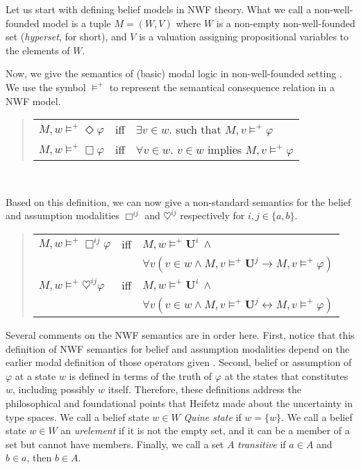 \documentclass{article}
\begin{document}
Let us start with defining belief models in NWF theory. What we call a non-well-founded model is a tuple $M = (W, V)$ where $W$ is a non-empty non-well-founded set (\emph{hyperset}, for short), and $V$ is a valuation assigning propositional variables to the elements of $W$.

Now, we give the semantics of (basic) modal logic in non-well-founded setting \cite{ger}. We use the symbol $\models^+$ to represent the semantical consequence relation in a NWF model.

\begin{quote}\begin{tabular}{lll}
$M, w \models^+ \Diamond \varphi$ & iff & $\exists v \in w.$ such that $M, v \models^+ \varphi$ \\
$M, w \models^+ \Box \varphi$ & iff & $\forall v \in w$. $v \in w$ implies $M, v \models^+ \varphi$
\end{tabular}\end{quote}\

Based on this definition, we can now give a non-standard semantics for the belief and assumption modalities $\Box^{ij}$ and $\heartsuit^{ij}$ respectively for $i, j \in \{ a, b \}$.

\begin{quote}\begin{tabular}{lll}
$M, w \models^+ \Box^{ij} \varphi$ & iff & $M, w \models^+ \mathbf{U}^i ~\wedge$ \\ && $\forall v (v \in w \wedge M, v \models^+ \mathbf{U}^j \rightarrow M, v \models^+ \varphi)$\\
$M, w \models^+ \heartsuit^{ij} \varphi$ & iff & $M, w \models^+ \mathbf{U}^i ~\wedge$ \\ && $\forall v (v \in w \wedge M, v \models^+ \mathbf{U}^j \leftrightarrow M, v \models^+ \varphi)$
\end{tabular}\end{quote}

Several comments on the NWF semantics are in order here. First, notice that this definition of NWF semantics for belief and assumption modalities depend on the earlier modal definition of those operators given \cite{bran0,ger}. Second, belief or assumption of $\varphi$ at a state $w$ is defined in terms of the truth of $\varphi$ at the states that constitutes $w$, including possibly $w$ itself. Therefore, these definitions address the philosophical and foundational points that Heifetz made about the uncertainty in type spaces. We call a belief state $w \in W$ \emph{Quine state} if $w = \{ w \}$. We call a belief state $w \in W$ an \emph{urelement} if it is not the empty set, and it can be a member of a set but cannot have members. Finally, we call a set $A$ \emph{transitive} if $a \in A$ and $b \in a$, then $b \in A$.
\end{document}
